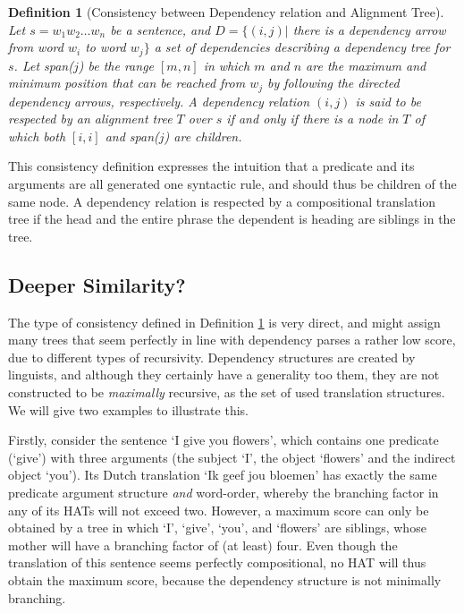 \documentclass{report}
\theoremstyle{definition}
\theoremstyle{plain}
\newtheorem{definition}{Definition}
\begin{document}
\begin{definition}[Consistency between Dependency relation and Alignment Tree]\label{def:depHAT}
Let $s = w_1 w_2 \dots w_n$ be a sentence, and $D = \{ (i,j) |$ there is a dependency arrow from word $w_i$ to word $w_j \}$ a set of dependencies describing a dependency tree for $s$. Let span($j$) be the range $[m,n]$ in which $m$ and $n$ are the maximum and minimum position that can be reached from $w_j$ by following the directed dependency arrows, respectively. A dependency relation $(i,j)$ is said to be respected by an alignment tree $T$ over $s$ if and only if there is a node in $T$ of which both $[i,i]$ and span($j$) are children.
\end{definition}

\noindent This consistency definition expresses the intuition that a predicate and its arguments are all generated one syntactic rule, and should thus be children of the same node. A dependency relation is respected by a compositional translation tree if the head and the entire phrase the dependent is heading are siblings in the tree.

\subsection{Deeper Similarity?}

The type of consistency defined in Definition \ref{def:depHAT} is very direct, and might assign many trees that seem perfectly in line with dependency parses a rather low score, due to different types of recursivity. Dependency structures are created by linguists, and although they certainly have a generality too them, they are not constructed to be \textit{maximally} recursive, as the set of used translation structures. We will give two examples to illustrate this.

Firstly, consider the sentence `I give you flowers', which contains one predicate (`give') with three arguments (the subject `I', the object `flowers' and the indirect object `you'). Its Dutch translation `Ik geef jou bloemen' has exactly the same predicate argument structure \textit{and} word-order, whereby the branching factor in any of its HATs will not exceed two. However, a maximum score can only be obtained by a tree in which `I', `give', `you', and `flowers' are siblings, whose mother will have a branching factor of (at least) four. Even though the translation of this sentence seems perfectly compositional, no HAT will thus obtain the maximum score, because the dependency structure is not minimally branching.
\end{document}

